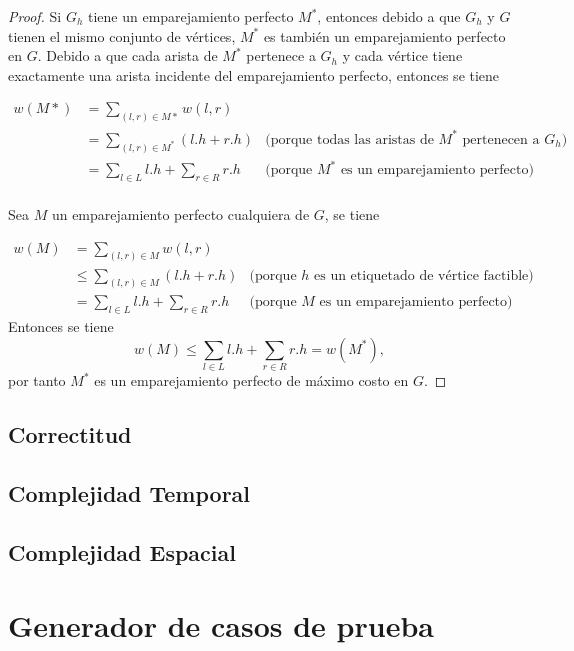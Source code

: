 \documentclass[10pt]{article} %
\begin{document}
	\begin{proof}
		Si $G_h$ tiene un emparejamiento perfecto $M^*$, entonces debido a que $G_h$ y $G$ tienen el mismo conjunto de v\'ertices, $M^*$ es tambi\'en un emparejamiento perfecto en $G$. Debido a que cada arista de $M^*$ pertenece a $G_h$ y cada v\'ertice tiene exactamente una arista incidente del emparejamiento perfecto, entonces se tiene
		
		\begin{align}
			w(M*) &= \sum_{(l,r) \in M*} w(l,r)\\
			&= \sum_{(l,r) \in M^*}(l.h + r.h) &\text{(porque todas las aristas de $M^*$ pertenecen a $G_h$)}\\
			&= \sum_{l \in L}l.h + \sum_{r \in R} r.h &\text{(porque $M^{*}$ es un emparejamiento perfecto)}\\
		\end{align} 
		
		Sea $M$ un emparejamiento perfecto cualquiera de $G$, se tiene
		
		\begin{align}
			w(M) &= \sum_{(l,r) \in M} w(l,r)\\
			&\leq \sum_{(l,r) \in M} (l.h + r.h) &\text{(porque $h$ es un etiquetado de v\'ertice factible)}\\
			&= \sum_{l \in L} l.h + \sum_{r \in R} r.h &\text{(porque $M$ es un emparejamiento perfecto)}
		\end{align}
		Entonces se tiene
		\begin{equation}
			w(M) \leq \sum_{l \in L} l.h + \sum_{r \in R} r.h = w(M^*),
		\end{equation}
		por tanto $M^*$ es un emparejamiento perfecto de m\'aximo costo en $G$.
	\end{proof}
	
	\subsection{Correctitud}
	
	\subsection{Complejidad Temporal}
	
	\subsection{Complejidad Espacial}
	
	\section{Generador de casos de prueba}
	
\end{document}
